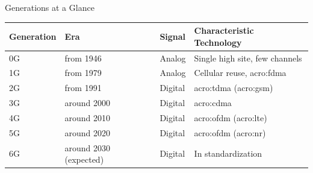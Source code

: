 \begin{frame}{Generations at a Glance}
  \centering
  \begin{tabular}{llll}
    \toprule
    \textbf{Generation} & \textbf{Era} & \textbf{Signal} & \textbf{Characteristic Technology} \\
    \midrule
    0G & from 1946 & Analog & Single high site, few channels \\
    1G & from 1979 & Analog & Cellular reuse, \acrshort{acro:fdma} \\
    2G & from 1991 & Digital & \acrshort{acro:tdma} (\acrshort{acro:gsm}) \\
    3G & around 2000 & Digital & \acrshort{acro:cdma} \\
    4G & around 2010 & Digital & \acrshort{acro:ofdm} (\acrshort{acro:lte}) \\
    5G & around 2020 & Digital & \acrshort{acro:ofdm} (\acrshort{acro:nr}) \\
    6G & around 2030 (expected) & Digital & In standardization \\
    \bottomrule
  \end{tabular}
\end{frame}




